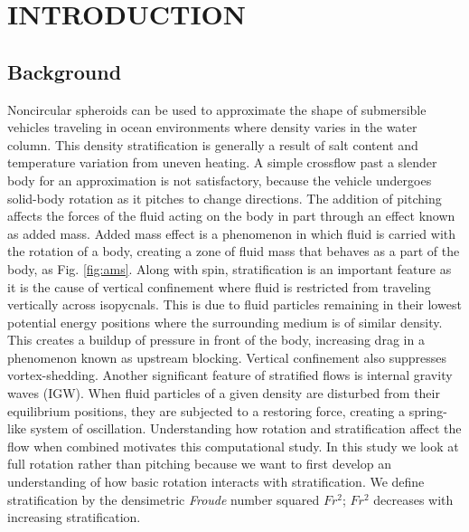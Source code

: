 %
%
%
%

\chapter{INTRODUCTION}
\thispagestyle{empty}

\section{Background}
Noncircular spheroids can be used to approximate the shape of submersible vehicles traveling in ocean environments where density varies in the water column. This density stratification is generally a result of salt content and temperature variation from uneven heating. A simple crossflow past a slender body for an approximation is not satisfactory, because the vehicle undergoes solid-body rotation as it pitches to change directions. The addition of pitching affects the forces of the fluid acting on the body in part through an effect known as added mass. Added mass effect is a phenomenon in which fluid is carried with the rotation of a body, creating a zone of fluid mass that behaves as a part of the body, as Fig. \ref{fig:ams}. Along with spin, stratification is an important feature as it is the cause of vertical confinement where fluid is restricted from traveling vertically across isopycnals. This is due to fluid particles remaining in their lowest potential energy positions where the surrounding medium is of similar density. This creates a buildup of pressure in front of the body, increasing drag in a phenomenon known as upstream blocking. Vertical confinement also suppresses vortex-shedding. Another significant feature of stratified flows is internal gravity waves (IGW). When fluid particles of a given density are disturbed from their equilibrium positions, they are subjected to a restoring force, creating a spring-like system of oscillation. Understanding how rotation and stratification affect the flow when combined motivates this computational study. In this study we look at full rotation rather than pitching because we want to first develop an understanding of how basic rotation interacts with stratification. We define stratification by the densimetric \textit{Froude} number squared $Fr^2$; $Fr^2$ decreases with increasing stratification.  

